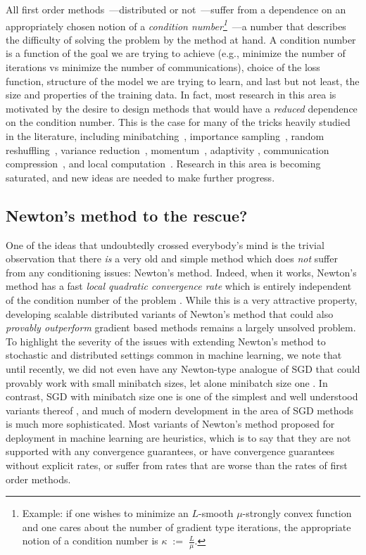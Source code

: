 \documentclass[12pt]{article}
\newcommand{\eqdef}{\; { := }\;}
\begin{document}
All first order methods~---distributed or not~---suffer from a dependence on an appropriately chosen notion of a {\em condition number\footnote{Example: if one wishes to minimize an $L$-smooth $\mu$-strongly convex function  and one cares about the number of gradient type iterations, the appropriate notion of a condition number is $\kappa \eqdef \frac{L}{\mu}$.}}~---a number that describes the difficulty of solving the problem by the method at hand. A condition number is a function of the goal we are trying to achieve (e.g., minimize the number of iterations vs minimize the  number of communications), choice of the loss function, structure of the model we are trying to learn, and last but not least, the size and properties of the training data. In fact, most research in this area is motivated by the desire to design methods that would have a {\em reduced} dependence on the condition number. This is the case for many of the tricks heavily studied in the literature, including minibatching~\citep{pegasos2}, importance sampling~\citep{NeedellWard2015, IProx-SDCA}, random reshuffling~\citep{RR}, variance reduction~\citep{schmidt2017minimizing, johnson2013accelerating, proxSVRG, SAGA}, momentum~\citep{SHB-NIPS, SMOMENTUM}, adaptivity \citep{MM2019}, communication compression~\citep{Alistarh17, Bernstein18, DIANA}, and local computation~\citep{COCOA+journal, localSGD-Stich,localSGD-AISTATS2020}.  Research in this area is becoming saturated, and new ideas are needed to make further progress.

\subsection{Newton's method to the rescue?} One of the ideas that undoubtedly crossed everybody's mind is the trivial observation that there {\em is} a very old and simple method which does {\em not} suffer from any conditioning issues: Newton's method. Indeed, when it works, Newton's method has a fast {\em local quadratic convergence rate} which is entirely independent of the condition number of the problem \citep{Beck-book-nonlinear}. While this is a very attractive property, developing  scalable distributed variants of Newton's method that could also {\em provably outperform} gradient based methods remains a largely unsolved problem. To highlight the severity of the issues with extending Newton's method to stochastic and distributed settings common in machine learning, we note that until recently, we did not even have any Newton-type analogue of SGD that could provably work with small minibatch sizes, let alone minibatch size one \citep{SN2019}. In contrast, SGD with minibatch size one is one of the simplest and well understood variants thereof \citep{NeedellWard2015}, and much of modern development in the area of SGD methods is much more sophisticated.  Most variants of Newton's method proposed for deployment in machine learning are heuristics, which is to say that they are not supported with any convergence guarantees, or have convergence guarantees without explicit rates, or suffer from rates that are worse than the rates of first order methods.  
\end{document}
